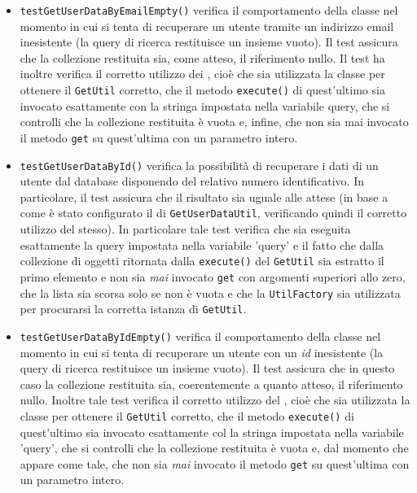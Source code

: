 \begin{itemize}
\begin{itemize}
\item \texttt{testGetUserDataByEmailEmpty()} verifica il comportamento della classe nel momento in cui si tenta di recuperare un utente tramite un indirizzo email inesistente (la query di ricerca restituisce un insieme vuoto). Il test assicura che la collezione restituita sia, come atteso, il riferimento nullo. Il test ha inoltre verifica il corretto utilizzo dei , cioè che sia utilizzata la classe  per ottenere il \texttt{GetUtil} corretto, che il metodo \texttt{execute()} di quest'ultimo sia invocato esattamente con la stringa impostata nella variabile query, che si controlli che la collezione restituita è vuota e, infine, che non sia mai invocato il metodo \texttt{get} su quest'ultima con un parametro intero.

\item \texttt{testGetUserDataById()} verifica la possibilità di recuperare i dati di un utente dal database disponendo del relativo numero identificativo. In particolare, il test assicura che il risultato sia uguale alle attese (in base a come è stato configurato il  di \texttt{GetUserDataUtil}, verificando quindi il corretto utilizzo del  stesso). In particolare tale test verifica che sia eseguita esattamente la query impostata nella variabile 'query' e il fatto che dalla collezione di oggetti ritornata dalla \texttt{execute()} del \texttt{GetUtil} sia estratto il primo elemento e non sia \textit{mai} invocato \texttt{get} con argomenti superiori allo zero, che la lista sia scorsa solo se non è vuota e che la \texttt{UtilFactory} sia utilizzata per procurarsi la corretta istanza di \texttt{GetUtil}.

\item \texttt{testGetUserDataByIdEmpty()} verifica il comportamento della classe nel momento in cui si tenta di recuperare un utente con un \textit{id} inesistente (la query di ricerca restituisce un insieme vuoto). Il test assicura che in questo caso la collezione restituita sia, coerentemente a quanto atteso, il riferimento nullo. Inoltre tale test verifica il corretto utilizzo del , cioè che sia utilizzata la classe  per ottenere il \texttt{GetUtil} corretto, che il metodo \texttt{execute()} di quest'ultimo sia invocato esattamente col la stringa impostata nella variabile 'query', che si controlli che la collezione restituita è vuota e, dal momento che appare come tale, che non sia \textit{mai} invocato il metodo \texttt{get} su quest'ultima con un parametro intero.


\end{itemize}
\end{itemize}
